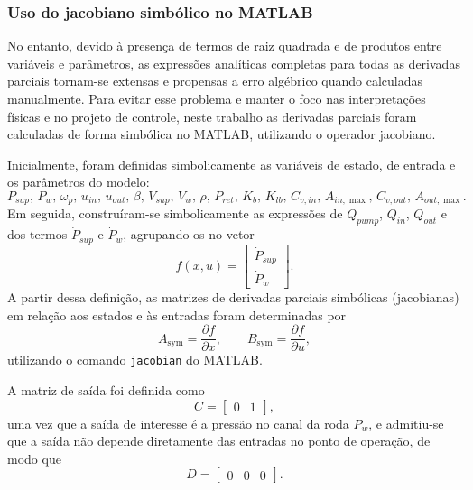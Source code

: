 \subsubsection*{Uso do jacobiano simbólico no MATLAB}

No entanto, devido à presença de termos de raiz quadrada e de produtos entre variáveis e parâmetros, as expressões analíticas completas para todas as derivadas parciais tornam-se extensas e propensas a erro algébrico quando calculadas manualmente. Para evitar esse problema e manter o foco nas interpretações físicas e no projeto de controle, neste trabalho as derivadas parciais foram calculadas de forma simbólica no MATLAB, utilizando o operador jacobiano.

Inicialmente, foram definidas simbolicamente as variáveis de estado, de entrada e os parâmetros do modelo:
\[
    P_{sup},\, P_w,\, \omega_p,\, u_{in},\, u_{out},\,
    \beta,\, V_{sup},\, V_w,\, \rho,\, P_{ret},\,
    K_b,\, K_{lb},\, C_{v,in},\, A_{in,\max},\, C_{v,out},\, A_{out,\max}.
\]
Em seguida, construíram-se simbolicamente as expressões de $Q_{pump}$, $Q_{in}$, $Q_{out}$ e dos termos $\dot{P}_{sup}$ e $\dot{P}_{w}$, agrupando-os no vetor
\[
    f(x,u) =
    \begin{bmatrix}
        \dot{P}_{sup} \\
        \dot{P}_{w}
    \end{bmatrix}.
\]
A partir dessa definição, as matrizes de derivadas parciais simbólicas (jacobianas) em relação aos estados e às entradas foram determinadas por
\[
    A_{\text{sym}} = \frac{\partial f}{\partial x},
    \qquad
    B_{\text{sym}} = \frac{\partial f}{\partial u},
\]
utilizando o comando \texttt{jacobian} do MATLAB.

A matriz de saída foi definida como
\[
    C = \begin{bmatrix} 0 & 1 \end{bmatrix},
\]
uma vez que a saída de interesse é a pressão no canal da roda $P_w$, e admitiu-se que a saída não depende diretamente das entradas no ponto de operação, de modo que
\[
    D = \begin{bmatrix} 0 & 0 & 0 \end{bmatrix}.
\]

